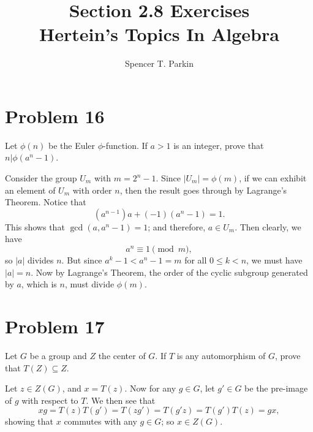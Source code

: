 \documentclass[12pt]{article}
\title{Section 2.8 Exercises\\Hertein's Topics In Algebra}
\author{Spencer T. Parkin}
\begin{document}
\maketitle

\section*{Problem 16}

Let $\phi(n)$ be the Euler $\phi$-function.  If $a>1$ is an integer, prove that
$n|\phi(a^n-1)$.

Consider the group $U_m$ with $m=2^n-1$.
Since $|U_m|=\phi(m)$, if we can exhibit an element of $U_m$
with order $n$, then the result goes through by Lagrange's Theorem.
Notice that
\begin{equation*}
(a^{n-1})a + (-1)(a^n-1) = 1.
\end{equation*}
This shows that $\gcd(a,a^n-1)=1$; and therefore, $a\in U_m$.
Then clearly, we have
\begin{equation*}
a^n\equiv 1\pmod{m},
\end{equation*}
so $|a|$ divides $n$.  But since $a^k-1<a^n-1=m$ for all $0\leq k<n$,
we must have $|a|=n$.  Now by Lagrange's Theorem, the order of
the cyclic subgroup generated by $a$, which is $n$, must divide $\phi(m)$.

\section*{Problem 17}

Let $G$ be a group and $Z$ the center of $G$.  If $T$ is any automorphism of $G$,
prove that $T(Z)\subseteq Z$.

Let $z\in Z(G)$, and $x=T(z)$.  Now for any $g\in G$, let $g'\in G$
be the pre-image of $g$ with respect to $T$.  We then see that
\begin{equation*}
xg=T(z)T(g')=T(zg')=T(g'z)=T(g')T(z)=gx,
\end{equation*}
showing that $x$ commutes with any $g\in G$; so $x\in Z(G)$.
\end{document}
